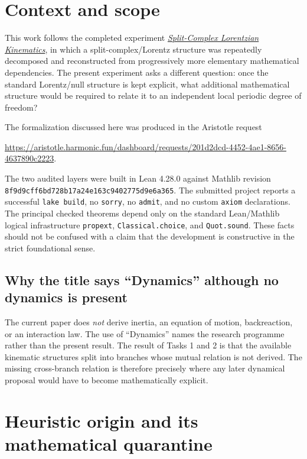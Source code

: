 \documentclass[11pt,a4paper]{article}
\begin{document}
\section{Context and scope}

This work follows the completed experiment \href{https://www.astronews.com/community/threads/split-complex-lorentzian-kinematics.12707/post-156281}{\emph{Split-Complex Lorentzian Kinematics}}, in which a split-complex/Lorentz structure was repeatedly decomposed and reconstructed from progressively more elementary mathematical dependencies.  The present experiment asks a different question: once the standard Lorentz/null structure is kept explicit, what additional mathematical structure would be required to relate it to an independent local periodic degree of freedom?

The formalization discussed here was produced in the Aristotle request
\begin{center}
\url{https://aristotle.harmonic.fun/dashboard/requests/201d2dcd-4452-4ae1-8656-4637890c2223}.
\end{center}
The two audited layers were built in Lean 4.28.0 against Mathlib revision
\texttt{8f9d9cff6bd728b17a24e163c9402775d9e6a365}.  The submitted project reports a successful \texttt{lake build}, no \texttt{sorry}, no \texttt{admit}, and no custom \texttt{axiom} declarations.  The principal checked theorems depend only on the standard Lean/Mathlib logical infrastructure \texttt{propext}, \texttt{Classical.choice}, and \texttt{Quot.sound}.  These facts should not be confused with a claim that the development is constructive in the strict foundational sense.

\subsection{Why the title says ``Dynamics'' although no dynamics is present}

The current paper does \emph{not} derive inertia, an equation of motion, backreaction, or an interaction law.  The use of ``Dynamics'' names the research programme rather than the present result.  The result of Tasks 1 and 2 is that the available kinematic structures split into branches whose mutual relation is not derived.  The missing cross-branch relation is therefore precisely where any later dynamical proposal would have to become mathematically explicit.

\section{Heuristic origin and its mathematical quarantine}
\label{sec:heuristic}
\end{document}
